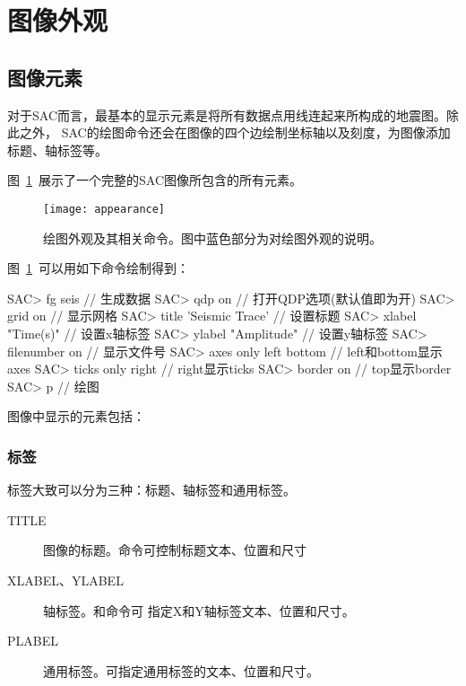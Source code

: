 \section{图像外观}
\label{sec:plot-appearance}

\subsection{图像元素}
对于SAC而言，最基本的显示元素是将所有数据点用线连起来所构成的地震图。除此之外，
SAC的绘图命令还会在图像的四个边绘制坐标轴以及刻度，为图像添加标题、轴标签等。

图~\ref{fig:plot-appearance}~展示了一个完整的SAC图像所包含的所有元素。

\begin{figure}[H]
\centering
\texttt{[image: appearance]}
\caption[绘图外观相关命令]{绘图外观及其相关命令。图中蓝色部分为对绘图外观的说明。}
\label{fig:plot-appearance}
\end{figure}

图~\ref{fig:plot-appearance}~可以用如下命令绘制得到：
\begin{SACCode}
SAC> fg seis                // 生成数据
SAC> qdp on                 // 打开QDP选项(默认值即为开)
SAC> grid on                // 显示网格                                          
SAC> title 'Seismic Trace'  // 设置标题                                          
SAC> xlabel "Time(s)"       // 设置x轴标签                                          
SAC> ylabel "Amplitude"     // 设置y轴标签                                       
SAC> filenumber on          // 显示文件号                                       
SAC> axes only left bottom  // left和bottom显示axes
SAC> ticks only right       // right显示ticks    
SAC> border on              // top显示border                                     
SAC> p                      // 绘图
\end{SACCode}

图像中显示的元素包括：
\subsubsection{标签}
标签大致可以分为三种：标题、轴标签和通用标签。
\begin{description}
\item[TITLE] 图像的标题。命令可控制标题文本、位置和尺寸
\item[XLABEL、YLABEL] 轴标签。和命令可
    指定X和Y轴标签文本、位置和尺寸。
\item[PLABEL] 通用标签。可指定通用标签的文本、位置和尺寸。
\end{description}

